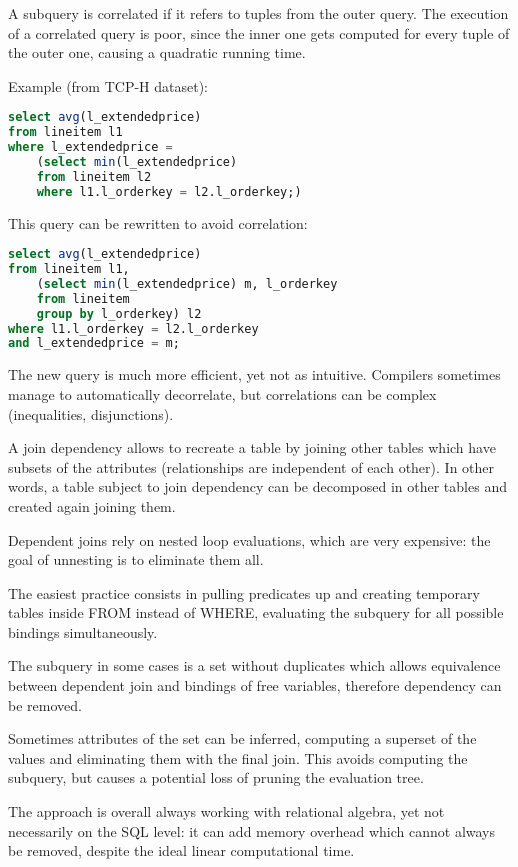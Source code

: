 A subquery is correlated if it refers to tuples from the outer query. The execution of a correlated query is poor, since the inner one gets computed for every tuple of the outer one, causing a quadratic running time.

Example (from TCP-H dataset):
\begin{lstlisting}[language=SQL]
select avg(l_extendedprice)
from lineitem l1
where l_extendedprice =
	(select min(l_extendedprice)
	from lineitem l2
	where l1.l_orderkey = l2.l_orderkey;)
\end{lstlisting}

This query can be rewritten to avoid correlation:
\begin{lstlisting}[language=SQL]
select avg(l_extendedprice)
from lineitem l1,
	(select min(l_extendedprice) m, l_orderkey
	from lineitem
	group by l_orderkey) l2
where l1.l_orderkey = l2.l_orderkey
and l_extendedprice = m;
\end{lstlisting}

The new query is much more efficient, yet not as intuitive. Compilers sometimes manage to automatically decorrelate, but correlations can be complex (inequalities, disjunctions).

A join dependency allows to recreate a table by joining other tables which have subsets of the attributes (relationships are independent of each other). In other words, a table subject to join dependency can be decomposed in other tables and created again joining them.

Dependent joins rely on nested loop evaluations, which are very expensive: the goal of unnesting is to eliminate them all.

The easiest practice consists in pulling predicates up and creating temporary tables inside FROM instead of WHERE, evaluating the subquery for all possible bindings simultaneously. 

The subquery in some cases is a set without duplicates which allows equivalence between dependent join and bindings of free variables, therefore dependency can be removed.

Sometimes attributes of the set can be inferred, computing a superset of the values and eliminating them with the final join. This avoids computing the subquery, but causes a potential loss of pruning the evaluation tree.

The approach is overall always working with relational algebra, yet not necessarily on the SQL level: it can add memory overhead which cannot always be removed, despite the ideal linear computational time.

